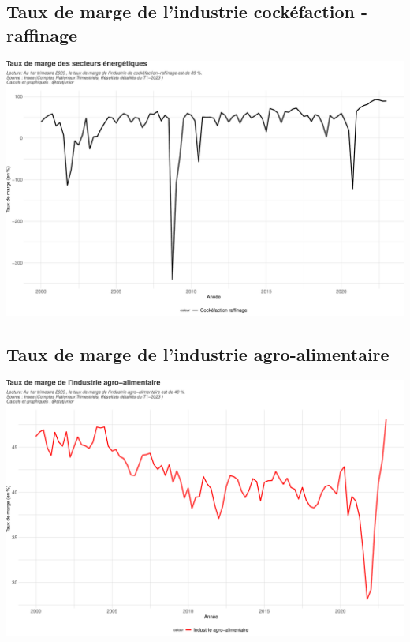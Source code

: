 \documentclass[
  paper=a4,
  ,captions=tableheading
]{scrartcl}
\begin{document}
\hypertarget{taux-de-marge-de-lindustrie-cockuxe9faction---raffinage}{%
\subsection{Taux de marge de l'industrie cockéfaction -
raffinage}\label{taux-de-marge-de-lindustrie-cockuxe9faction---raffinage}}

\includegraphics{rapport_pdf_compte_branche_files/figure-latex/unnamed-chunk-26-1.pdf}

\hypertarget{taux-de-marge-de-lindustrie-agro-alimentaire}{%
\subsection{Taux de marge de l'industrie
agro-alimentaire}\label{taux-de-marge-de-lindustrie-agro-alimentaire}}

\includegraphics{rapport_pdf_compte_branche_files/figure-latex/unnamed-chunk-27-1.pdf}
\end{document}
